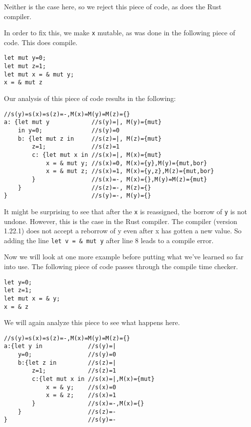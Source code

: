 Neither is the case here, so we reject this piece of code, as does the Rust compiler. 

In order to fix this, we make \texttt{x} mutable, as was done in the following piece of code. This does compile.

\begin{verbatim}
let mut y=0;
let mut z=1;
let mut x = & mut y; 
x = & mut z
\end{verbatim}

Our analysis of this piece of code results in the following: 

\begin{verbatim}
//s(y)=s(x)=s(z)=-,M(x)=M(y)=M(z)={}
a: {let mut y            //s(y)=|, M(y)={mut}
    in y=0;              //s(y)=0
    b: {let mut z in     //s(z)=|, M(z)={mut}
        z=1;             //s(z)=1
        c: {let mut x in //s(x)=|, M(x)={mut}
            x = & mut y; //s(x)=0, M(x)={y},M(y)={mut,bor}
            x = & mut z; //s(x)=1, M(x)={y,z},M(z)={mut,bor}
        }                //s(x)=-, M(x)={},M(y)=M(z)={mut}
    }                    //s(z)=-, M(z)={}
}                        //s(y)=-, M(y)={}
\end{verbatim}

It might be surprising to see that after the \texttt{x} is reassigned, the borrow of \texttt{y} is not undone. However, this is the case in the Rust compiler. The compiler (version 1.22.1) does not accept a reborrow of y even after x has gotten a new value. So adding the line \texttt{let v = & mut y} after line 8 leads to a compile error. 

Now we will look at one more example before putting what we've learned so far into use. The following piece of code passes through the compile time checker.

\begin{verbatim}
let y=0;
let z=1;
let mut x = & y; 
x = & z
\end{verbatim}

We will again analyze this piece to see what happens here. 

\begin{verbatim}
//s(y)=s(x)=s(z)=-,M(x)=M(y)=M(z)={}
a:{let y in             //s(y)=|
    y=0;                //s(y)=0
    b:{let z in         //s(z)=|
        z=1;            //s(z)=1
        c:{let mut x in //s(x)=|,M(x)={mut}
            x = & y;    //s(x)=0
            x = & z;    //s(x)=1
        }               //s(x)=-,M(x)={}
    }                   //s(z)=-
}                       //s(y)=-
\end{verbatim}

